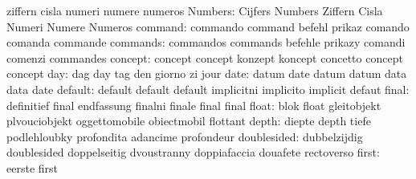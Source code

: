                            ziffern                   cisla
                           numeri                    numere
                           numeros
                  Numbers: Cijfers                   Numbers
                           Ziffern                   Cisla
                           Numeri                    Numere
                           Numeros
                  command: commando                  command
                           befehl                    prikaz
                           comando                   comanda
                           commande
                 commands: commandos                 commands
                           befehle                   prikazy
                           comandi                   comenzi
                           commandes
                  concept: concept                   concept
                           konzept                   koncept
                           concetto                  concept
                           concept
                      day: dag                       day
                           tag                       den
                           giorno                    zi
                           jour
                     date: datum                     date
                           datum                     datum
                           data                      data
                           date
                  default: default                   default
                           default                   implicitni
                           implicito                 implicit
                           defaut
                    final: definitief                final
                           endfassung                finalni
                           finale                    final
                           final
                    float: blok                      float
                           gleitobjekt               plvouciobjekt
                           oggettomobile             obiectmobil
                           flottant
                    depth: diepte                    depth
                           tiefe                     podlehloubky
                           profondita                adancime
                           profondeur
              doublesided: dubbelzijdig              doublesided
                           doppelseitig              dvoustranny
                           doppiafaccia              douafete
                           rectoverso
                    first: eerste                    first
